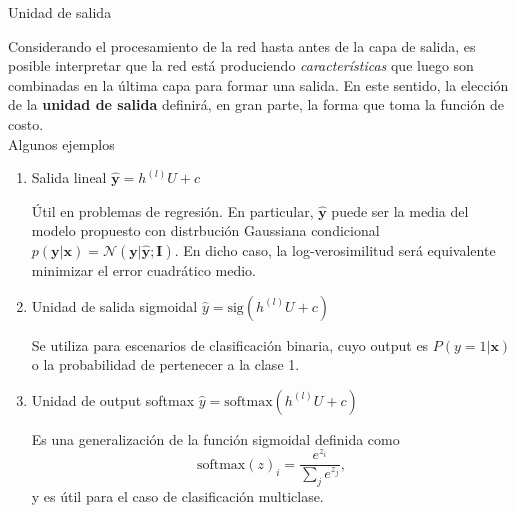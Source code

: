\documentclass[handout, 9pt]{beamer}
\begin{document}
\begin{frame}{Unidad de salida}

Considerando el procesamiento de la red hasta antes de la capa de salida, es posible interpretar que la red está produciendo \emph{características} que luego son combinadas en la última capa para formar una salida. En este sentido, la elección de la \textbf{unidad de salida} definirá, en gran parte,  la forma que toma la función de costo. \\Algunos ejemplos 
\begin{enumerate}
  \item Salida lineal $\hat{\bm{y}} = h^{(l)}U + c$ \pause

  Útil en problemas de regresión. En particular, $\hat{\bm{y}}$ puede ser la media del modelo propuesto con distrbución Gaussiana condicional $p(\bm{y}|\bm{x}) = \mathcal{N}(\bm{y}|\hat{\bm{y}};\bm{I})$. En dicho caso, la log-verosimilitud será equivalente minimizar el error cuadrático medio. \pause

  \item Unidad de salida sigmoidal $\hat{{y}} = \text{sig}(h^{(l)}U + c)$ \pause

  Se utiliza para escenarios de clasificación binaria, cuyo output es $P(y=1|\bm{x})$ o la probabilidad de pertenecer a la clase 1. \pause

  \item Unidad de output softmax $\hat{{y}} = \text{softmax}(h^{(l)}U + c)$ \pause 

  Es una generalización de la función sigmoidal definida como 
  \begin{equation*}
  \text{softmax}(z)_i = \frac{e^{z_i}}{\sum_{j}e^{z_j}},
  \end{equation*}
  y es útil para el caso de clasificación multiclase. 
\end{enumerate}

\end{frame}

\begin{frame}
  \titlepage
\end{frame}


%
\end{document}
